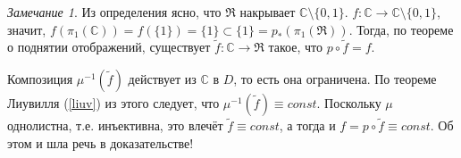 \documentclass[12pt]{article}
\newcommand{\N}{\mathbb{N}}
\renewcommand{\C}{\mathbb{C}}
\theoremstyle{thmnote}
\theoremstyle{remark}
\newtheorem*{remark}{Замечание}
\theoremstyle{defnote}
\begin{document}
\begin{remark}

    Из определения ясно, что $\mathfrak{R}$ накрывает $\C \setminus \{0,1\}$. $f: \C \to \C \setminus \{0,1\}$, значит, $f(\pi_1(\C)) = f(\{1\}) = \{1\} \subset \{1\} = p_*(\pi_1(\mathfrak{R}))$. Тогда, по теореме о поднятии отображений, существует $\tilde{f}: \C \to \mathfrak{R}$ такое, что $p \circ \tilde{f} = f$.

    Композиция $\mu^{-1}(\tilde{f})$ действует из $\C$ в $D$, то есть она ограничена. По теореме Лиувилля (\ref{liuv}) из этого следует, что $\mu^{-1}(\tilde{f}) \equiv const$. Поскольку $\mu$ однолистна, т.е. инъективна, это влечёт $\tilde{f} \equiv const$, а тогда и $f = p \circ \tilde{f} \equiv const$. Об этом и шла речь в доказательстве!
\end{remark}



\end{document}
